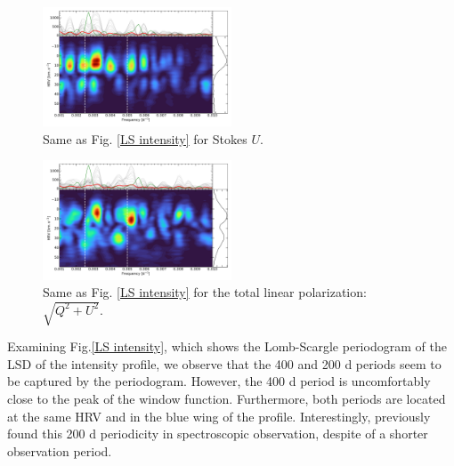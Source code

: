 \documentclass{aa}
\begin{document}
\begin{figure}[!h]
    \centering
    \includegraphics[width=0.5\textwidth]{Lomb-Scargle Stokes U.pdf}
    \caption{Same as Fig. \ref{LS intensity} for Stokes $U$.}
    \label{LS U}
\end{figure}


\begin{figure}[!h]
    \centering
    \includegraphics[width=0.5\textwidth]{Lomb-Scargle linear polarization.pdf}
    \caption{Same as Fig. \ref{LS intensity} for the total linear polarization: $\sqrt{Q^2+U^2}$.}
    \label{LS linear polarization}
\end{figure}




Examining Fig.\ref{LS intensity}, which shows the Lomb-Scargle periodogram of the LSD of the intensity profile, we observe that the 400 and 200 d periods seem to be captured by the periodogram. However, the 400 d period is uncomfortably close to the peak of the window function. Furthermore, both periods are located at the same HRV and in the blue wing of the profile. Interestingly, \cite{mathias_evolution_2018} previously found this 200 d periodicity in spectroscopic observation, despite of a shorter observation period. 
\end{document}
